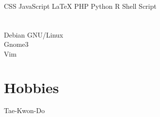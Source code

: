 \documentclass[]{friggeri-cv}
\begin{document}
%
%
\begin{aside}
~
~
~
  \section{}
    CSS
    JavaScript
    \LaTeX
    PHP
    Python
    R
    Shell Script
  ~
  \section{}
    Debian GNU/Linux \\%
    Gnome3 \\%
    Vim
  ~
  \section{Hobbies}
      \href{http://olhares.com/diraol}{}
      Tae-Kwon-Do
\end{aside}
\end{document}
